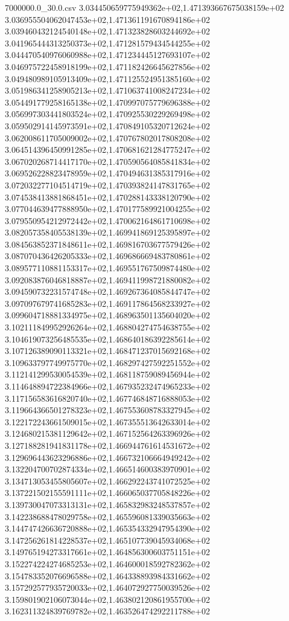 \begin{filecontents*}{7000000.0_30.0.csv}
3.034450659775949362e+02,1.471393667675038159e+02
3.036955504062047453e+02,1.471361191670894186e+02
3.039460432124540148e+02,1.471323828603244692e+02
3.041965444313250373e+02,1.471281579434544255e+02
3.044470540976060988e+02,1.471234445127693107e+02
3.046975722458918199e+02,1.471182426645627856e+02
3.049480989105913409e+02,1.471125524951385160e+02
3.051986341258905213e+02,1.471063741008247234e+02
3.054491779258165138e+02,1.470997075779696388e+02
3.056997303441803524e+02,1.470925530229269498e+02
3.059502914145973591e+02,1.470849105320712624e+02
3.062008611705009002e+02,1.470767802017808208e+02
3.064514396450991285e+02,1.470681621284775247e+02
3.067020268714417170e+02,1.470590564085841834e+02
3.069526228823478959e+02,1.470494631385317916e+02
3.072032277104514719e+02,1.470393824147831765e+02
3.074538413881868451e+02,1.470288143338120790e+02
3.077044639477888950e+02,1.470177589921004255e+02
3.079550954212972442e+02,1.470062164861710698e+02
3.082057358405538139e+02,1.469941869125395897e+02
3.084563852371848611e+02,1.469816703677579426e+02
3.087070436426205333e+02,1.469686669483780861e+02
3.089577110881153317e+02,1.469551767509874480e+02
3.092083876046818887e+02,1.469411998721880082e+02
3.094590732231574748e+02,1.469267364085844747e+02
3.097097679741685283e+02,1.469117864568233927e+02
3.099604718881334975e+02,1.468963501135604020e+02
3.102111849952926264e+02,1.468804274754638755e+02
3.104619073256485535e+02,1.468640186392285614e+02
3.107126389090113321e+02,1.468471237015692168e+02
3.109633797749975770e+02,1.468297427592251552e+02
3.112141299530054539e+02,1.468118759089456944e+02
3.114648894722384966e+02,1.467935232474965233e+02
3.117156583616820740e+02,1.467746848716888053e+02
3.119664366501278323e+02,1.467553608783327945e+02
3.122172243661509015e+02,1.467355513642633014e+02
3.124680215381129642e+02,1.467152564263396926e+02
3.127188281941831178e+02,1.466944761614531672e+02
3.129696443623296886e+02,1.466732106664949242e+02
3.132204700702874334e+02,1.466514600383970901e+02
3.134713053455805607e+02,1.466292243741072525e+02
3.137221502155591111e+02,1.466065037705848226e+02
3.139730047073313131e+02,1.465832983248537857e+02
3.142238688478029758e+02,1.465596081339035663e+02
3.144747426636720888e+02,1.465354332947954390e+02
3.147256261814228537e+02,1.465107739045934068e+02
3.149765194273317661e+02,1.464856300603751151e+02
3.152274224274685253e+02,1.464600018592782362e+02
3.154783352076696588e+02,1.464338893984331662e+02
3.157292577935720033e+02,1.464072927750039526e+02
3.159801902106073044e+02,1.463802120861955700e+02
3.162311324839769782e+02,1.463526474292211788e+02

\end{filecontents*}
